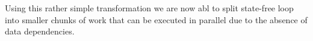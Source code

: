 Using this rather simple transformation we are now abl to split state-free loop into smaller chunks of work that can be executed in parallel due to the absence of data dependencies.



